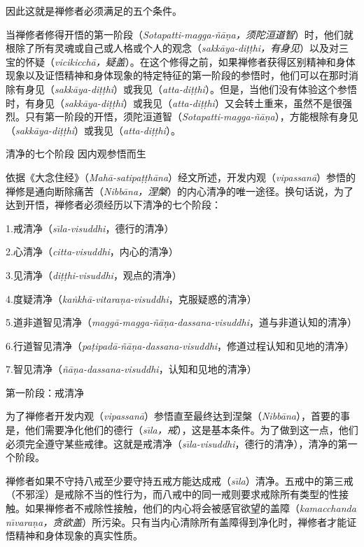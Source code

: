因此这就是禅修者必须满足的五个条件。

当禅修者修得开悟的第一阶段（{\it Sotapatti-magga-\~n\=a\d na，须陀洹道智}）时，他们就根除了所有灵魂或自己或人格或个人的观念（{\it sakk\=aya-di\d t\d thi，有身见}）以及对三宝的怀疑（{\it vicikicch\=a，疑盖}）。在这个修得之前，如果禅修者获得区别精神和身体现象以及证悟精神和身体现象的特定特征的第一阶段的参悟时，他们可以在那时消除有身见（{\it sakk\=aya-di\d t\d thi}）或我见（{\it atta-di\d t\d thi}）。但是，当他们没有体验这个参悟时，有身见（{\it sakk\=aya-di\d t\d thi}）或我见（{\it atta-di\d t\d thi}）又会转土重来，虽然不是很强烈。只有第一阶段的开悟，须陀洹道智（{\it Sotapatti-magga-\~n\=a\d na}），方能根除有身见（{\it sakk\=aya-di\d t\d thi}）或我见（{\it atta-di\d t\d thi}）。

\subsectnontp \1清净的七个阶段 因内观参悟而生

依据《大念住经》（{\it Mah\=a-satipa\d t\d th\=ana}）经文所述，开发内观（{\it vipassan\=a}）参悟的禅修是通向断除痛苦（{\it  Nibb\=ana，涅槃}）的内心清净的唯一途径。换句话说，为了达到开悟，禅修者必须经历以下清净的七个阶段：

{
\leftskip=1.6pc
\item{1.}戒清净（{\it s\=\i la-visuddhi}，德行的清净）
\item{2.}心清净（{\it citta-visuddhi}，内心的清净）
\item{3.}见清净（{\it di\d t\d thi-visuddhi}，观点的清净）
\item{4.}度疑清净（{\it ka\.nkh\=a-vitara\d na-visuddhi}，克服疑惑的清净）
\item{5.}道非道智见清净（{\it magg\=a-magga-\~n\=a\d na-dassana-visuddhi}，道与非道认知的清净）
\item{6.}行道智见清净（{\it pa\d tipad\=a-\~n\=a\d na-dassana-visuddhi}，修道过程认知和见地的清净）
\item{7.}智见清净（{\it \~n\=a\d na-dassana-visuddhi}，认知和见地的清净）

}

\ssubsectnon 第一阶段：戒清净

为了禅修者开发内观（{\it vipassan\=a}）参悟直至最终达到涅槃（{\it Nibb\=ana}），首要的事是，他们需要净化他们的德行（{\it s\= \i la，戒}），这是基本条件。为了做到这一点，他们必须完全遵守某些戒律。这就是戒清净（{\it s\=\i la-visuddhi}，德行的清净），清净的第一个阶段。

\1禅修者如果不守持八戒至少要守持五戒方能达成戒（{\it s\=\i la}）清净。五戒中的第三戒（不邪淫）是戒除不当的性行为，而八戒中的同一戒则要求戒除所有类型的性接触。如果禅修者不戒除性接触，他们的内心将会被感官欲望的盖障（{\it kamacchanda n\=\i vara\d na，贪欲盖}）所污染。只有当内心清除所有盖障得到净化时，禅修者才能证悟精神和身体现象的真实性质。

